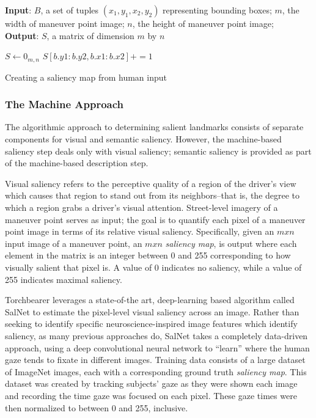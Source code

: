 \begin{algorithm}[htbp]
\textbf{Input}: $B$, a set of tuples $(x_1, y_1, x_2, y_2)$ representing bounding boxes;
$m$, the width of maneuver point image;
$n$, the height of maneuver point image; \\
\textbf{Output}: $S$, a matrix of dimension $m$ by $n$ 
\begin{algorithmic}[1]
\State $S\gets 0_{m,n}$
\State $S[b.y1:b.y2, b.x1:b.x2] += 1$
\EndFor
{}
\end{algorithmic}
\caption{Creating a saliency map from human input}\label{alg:saliencyMap}
\label{alg:saliencyMap}
\end{algorithm} 

\subsubsection{The Machine Approach}
The algorithmic approach to determining salient landmarks consists of separate components for visual and semantic saliency. However, the machine-based saliency step deals only with visual saliency; semantic saliency is provided as part of the machine-based description step.

Visual saliency refers to the perceptive quality of a region of the driver’s view which causes that region to stand out from its neighbors--that is, the degree to which a region grabs a driver’s visual attention. Street-level imagery of a maneuver point serves as input; the goal is to quantify each pixel of a maneuver point image in terms of its relative visual saliency. Specifically, given an $m x n$ input image of a maneuver point, an $m x n$ \textit{saliency map}, is output where each element in the matrix is an integer between 0 and 255 corresponding to how visually salient that pixel is. A value of 0 indicates no saliency, while a value of 255 indicates maximal saliency.

Torchbearer leverages a state-of-the art, deep-learning based algorithm called SalNet \cite{Pan_2016_CVPR} to estimate the pixel-level visual saliency across an image. Rather than seeking to identify specific neuroscience-inspired image features which identify saliency, as many previous approaches do, SalNet takes a completely data-driven approach, using a deep convolutional neural network to “learn” where the human gaze tends to fixate in different images. Training data consists of a large dataset of ImageNet \cite{imagenet_cvpr09} images, each with a corresponding ground truth \textit{saliency map}. This dataset was created by tracking subjects’ gaze as they were shown each image and recording the time gaze was focused on each pixel. These gaze times were then normalized to between 0 and 255, inclusive.

